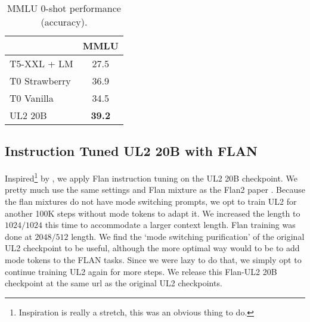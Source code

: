 \documentclass[10pt]{article}
\begin{document}
\begin{table}[H]
\begin{center}
\caption{MMLU 0-shot performance (accuracy).}
\label{table:mmlu}
\begin{tabular}{lc}
\toprule
                     & \multicolumn{1}{l}{MMLU} \\
                     \midrule
T5-XXL + LM  & 27.5                            \\
T0 Strawberry        & 36.9                            \\
T0 Vanilla           & 34.5                            \\
UL2 20B              & \textbf{39.2}                            \\
    \bottomrule
\end{tabular}
\end{center}
\end{table}

\subsection{Instruction Tuned UL2 20B with FLAN}
Inspired\footnote{Inspiration is really a stretch, this was an obvious thing to do.} by \citet{chung2022scaling}, we apply Flan instruction tuning on the UL2 20B checkpoint. We pretty much use the same settings and Flan mixture as the Flan2 paper \citep{chung2022scaling}. Because the flan mixtures do not have mode switching prompts, we opt to train UL2 for another 100K steps without mode tokens to adapt it. We increased the length to $1024/1024$ this time to accommodate a larger context length. Flan training was done at $2048/512$ length. We find the `mode switching purification' of the original UL2 checkpoint to be useful, although the more optimal way would to be to add mode tokens to the FLAN tasks. Since we were lazy to do that, we simply opt to continue training UL2 again for more steps. We release this Flan-UL2 20B checkpoint at the same url as the original UL2 checkpoints. 
\end{document}
